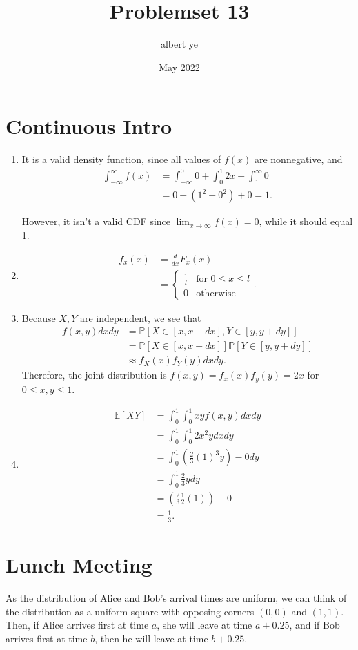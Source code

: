 \documentclass{article}
\title{Problemset 13}
\author{albert ye}
\date{May 2022}
\newcommand{\p}{\mathbb{P}}
\newcommand{\ex}{\mathbb{E}}
\begin{document}
\maketitle
\section{Continuous Intro}
\begin{enumerate}[label=(\alph*)]
	\item It is a valid density function, since all values of $f(x)$ are nonnegative, and
	\begin{align*}
		\int_{-\infty}^\infty f(x) &= \int_{-\infty}^0 0 + \int_0^1 2x + \int_1^\infty 0 \\
		&= 0 + (1^2-0^2) + 0 = 1.
	\end{align*}

	However, it isn't a valid CDF since $\lim_{x \to \infty} f(x) = 0$, while it should equal 1.
	\item \begin{align*}
		f_x(x) &= \frac{d}{dx} F_x(x) \\
		&= \begin{cases}
			\frac{1}{l} & \text{for } 0 \leq x \leq l \\
			0 & \text{otherwise}
			\end{cases}.
		\end{align*}
	\item Because $X, Y$ are independent, we see that
	\begin{align*} 
		f(x, y) dx dy &= \p[X \in [x, x+dx], Y \in [y, y+dy]] \\
		&= \p[X \in [x, x+dx]] \p[Y \in [y, y+dy]] \\
		&\approx f_X(x) f_Y(y) dx dy.
	\end{align*}
	Therefore, the joint distribution is $f(x, y) = f_x(x) f_y(y) = 2x$ for $0 \leq x,y \leq 1$.
	\item \begin{align*}
		\ex[XY] &= \int_0^1 \int_0^1 xyf(x,y) dxdy \\
		&= \int_0^1 \int_0^1 2x^2y dxdy \\
		&= \int_0^1 (\frac{2}{3}(1)^3y)-0 dy \\
		&= \int_0^1 \frac{2}{3}y dy \\
		&= (\frac{2}{3} \frac{1}{2}(1)) - 0 \\
		&= \boxed{\frac{1}{3}}.
	\end{align*}
\end{enumerate}
\newpage
\section{Lunch Meeting}
As the distribution of Alice and Bob's arrival times are uniform, we can think of the distribution as a uniform square with opposing corners $(0,0)$ and $(1,1)$. Then, if Alice arrives first at time $a$, she will leave at time $a+0.25$, and if Bob arrives first at time $b$, then he will leave at time $b+0.25$.
\end{document}
